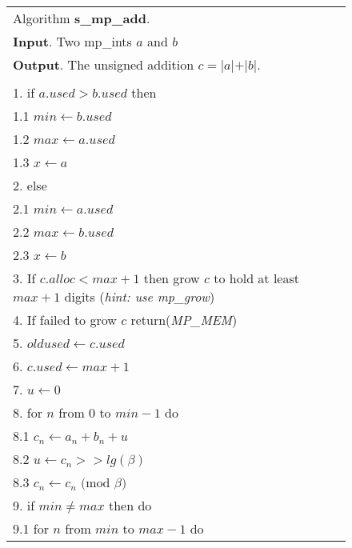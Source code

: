 \documentclass[b5paper]{book}
\begin{document}
\newpage
\begin{figure}[!here]
\begin{center}
\begin{small}
\begin{tabular}{l}
\hline Algorithm \textbf{s\_mp\_add}. \\
\textbf{Input}.   Two mp\_ints $a$ and $b$ \\
\textbf{Output}.  The unsigned addition $c = \vert a \vert + \vert b \vert$. \\
\hline \\
1.  if $a.used > b.used$ then \\
\hspace{+3mm}1.1  $min \leftarrow b.used$ \\
\hspace{+3mm}1.2  $max \leftarrow a.used$ \\
\hspace{+3mm}1.3  $x   \leftarrow a$ \\
2.  else  \\
\hspace{+3mm}2.1  $min \leftarrow a.used$ \\
\hspace{+3mm}2.2  $max \leftarrow b.used$ \\
\hspace{+3mm}2.3  $x   \leftarrow b$ \\
3.  If $c.alloc < max + 1$ then grow $c$ to hold at least $max + 1$ digits (\textit{hint: use mp\_grow}) \\
4.  If failed to grow $c$ return(\textit{MP\_MEM}) \\
5.  $oldused \leftarrow c.used$ \\
6.  $c.used \leftarrow max + 1$ \\
7.  $u \leftarrow 0$ \\
8.  for $n$ from $0$ to $min - 1$ do \\
\hspace{+3mm}8.1  $c_n \leftarrow a_n + b_n + u$ \\
\hspace{+3mm}8.2  $u \leftarrow c_n >> lg(\beta)$ \\
\hspace{+3mm}8.3  $c_n \leftarrow c_n \mbox{ (mod }\beta\mbox{)}$ \\
9.  if $min \ne max$ then do \\
\hspace{+3mm}9.1  for $n$ from $min$ to $max - 1$ do \\

\end{tabular}
\end{small}
\end{center}
\end{figure}
\end{document}
